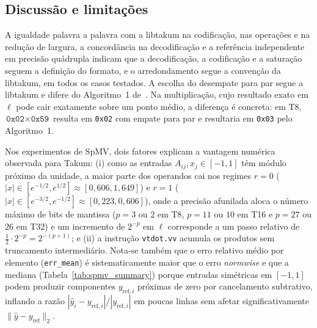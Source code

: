 \documentclass[journal]{IEEEtran}
\begin{document}
\subsection{Discussão e limitações}
A igualdade palavra a palavra com a libtakum na codificação, nas
operações e na redução de largura, a concordância na decodificação e a
referência independente em precisão quádrupla indicam que a decodificação, a
codificação e a saturação seguem a definição do formato, e o
arredondamento segue a convenção da libtakum, em todos os casos
testados. A escolha do desempate para par segue a
libtakum e difere do Algoritmo~1 de~\cite{hunhold2024beating}. Na
multiplicação, cujo resultado exato em $\ell$ pode cair exatamente sobre
um ponto médio, a diferença é concreta: em T8, $\texttt{0x02}\times
\texttt{0x59}$ resulta em \texttt{0x02} com empate para par e resultaria
em \texttt{0x03} pelo Algoritmo~1.

Nos experimentos de SpMV, dois fatores explicam a vantagem numérica observada
para Takum: (i) como as entradas $A_{ij}, x_j \in [-1, 1]$ têm módulo próximo
da unidade, a maior parte dos operandos cai nos regimes $r=0$
($|x|\in [e^{-1/2}, e^{1/2}]\approx [0{,}606, 1{,}649]$) e $r=1$
($|x|\in [e^{-3/2}, e^{-1/2}]\approx [0{,}223, 0{,}606]$), onde a precisão
afunilada aloca o número máximo de bits de mantissa ($p=3$ ou $2$ em T8,
$p=11$ ou $10$ em T16 e $p=27$ ou $26$ em T32) e um incremento de $2^{-p}$ em
$\ell$ corresponde a um passo relativo de $\tfrac{1}{2}\cdot 2^{-p}=2^{-(p+1)}$;
e (ii) a instrução \texttt{vtdot.vv} acumula os produtos sem truncamento
intermediário. Nota-se também que o erro relativo médio por elemento
(\texttt{err\_mean}) é sistematicamente maior que o erro \emph{normwise} e que
a mediana (Tabela~\ref{tab:spmv_summary}) porque entradas simétricas em
$[-1,1]$ podem produzir componentes $y_{\mathrm{ref},i}$ próximas de zero por
cancelamento subtrativo, inflando a razão $|\hat{y}_i-y_{\mathrm{ref},i}|/|y_{\mathrm{ref},i}|$
em poucas linhas sem afetar significativamente $\|\hat{y}-y_{\mathrm{ref}}\|_2$.
\end{document}
